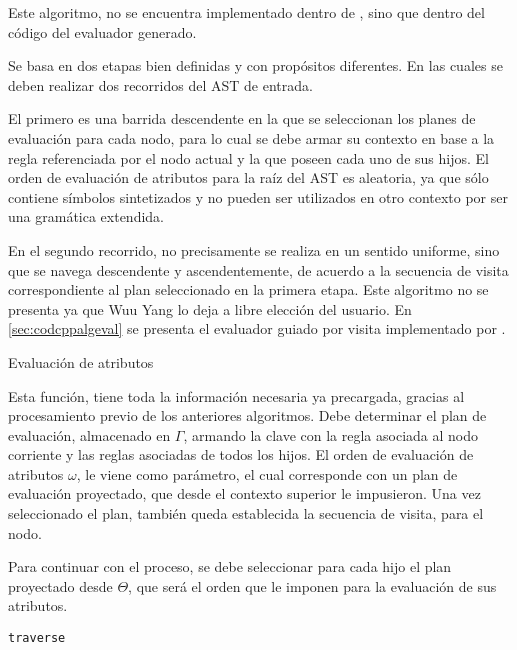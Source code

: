 Este algoritmo, no se encuentra implementado dentro de \maggen, sino que dentro del código del evaluador generado.

Se basa en dos etapas bien definidas y con propósitos diferentes. En las cuales se deben realizar dos recorridos del AST de entrada.

El primero es una barrida descendente en la que se seleccionan los planes de evaluación para cada nodo, para lo cual se debe armar su contexto en base a la regla referenciada por el nodo actual y la que poseen cada uno de sus hijos. El orden de evaluación de atributos para la raíz del AST es aleatoria, ya que sólo contiene símbolos sintetizados y no pueden ser utilizados en otro contexto por ser una gramática extendida.

En el segundo recorrido, no precisamente se realiza en un sentido uniforme, sino que se navega descendente y ascendentemente, de acuerdo a la secuencia de visita correspondiente al plan seleccionado en la primera etapa. Este algoritmo no se presenta ya que Wuu Yang lo deja a libre elección del usuario. En \ref{sec:codcppalgeval} se presenta el evaluador guiado por visita implementado por \maggen.

\begin{algorithm}[H]

\caption{Evaluación de atributos}
\end{algorithm}

Esta función, tiene toda la información necesaria ya precargada, gracias al procesamiento previo de los anteriores algoritmos. Debe determinar el plan de evaluación, almacenado en $\Gamma$, armando la clave con la regla asociada al nodo corriente y las reglas asociadas de todos los hijos. El orden de evaluación de atributos $\omega$, le viene como parámetro, el cual corresponde con un plan de evaluación proyectado, que desde el contexto superior le impusieron. Una vez seleccionado el plan, también queda establecida la secuencia de visita, para el nodo.

Para continuar con el proceso, se debe seleccionar para cada hijo el plan proyectado desde $\Theta$, que será el orden que le imponen para la evaluación de sus atributos.

\begin{algorithm}[H]

\caption{\texttt{traverse}}
\end{algorithm}